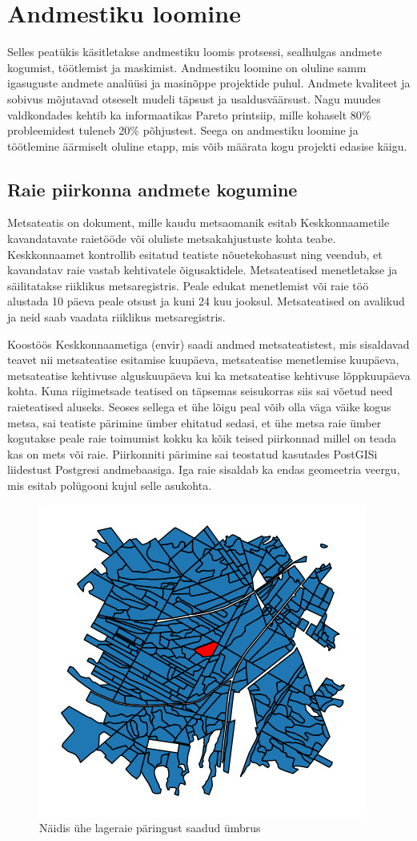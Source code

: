 \section{Andmestiku loomine}
Selles peatükis käsitletakse andmestiku loomis protsessi, sealhulgas andmete kogumist, töötlemist ja maskimist. Andmestiku loomine on oluline samm igasuguste andmete analüüsi ja masinõppe projektide puhul. Andmete kvaliteet ja sobivus mõjutavad otseselt mudeli täpsust ja usaldusväärsust. Nagu muudes valdkondades kehtib ka informaatikas Pareto printsiip, mille kohaselt 80\% probleemidest tuleneb 20\% põhjustest. Seega on andmestiku loomine ja töötlemine äärmiselt oluline etapp, mis võib määrata kogu projekti edasise käigu.

\subsection{Raie piirkonna andmete kogumine}
Metsateatis on dokument, mille kaudu metsaomanik esitab Keskkonnaametile
kavandatavate raietööde või oluliste metsakahjustuste kohta teabe. Keskkonnaamet
kontrollib esitatud teatiste nõuetekohasust ning veendub, et kavandatav raie
vastab kehtivatele õigusaktidele. Metsateatised menetletakse ja säilitatakse
riiklikus metsaregistris. Peale edukat menetlemist või raie töö alustada 10 päeva peale otsust ja kuni 24 kuu jooksul. \cite{MetsateatisJaMetsaregister} Metsateatised on avalikud ja neid saab vaadata riiklikus metsaregistris.

Koostöös Keskkonnaametiga (envir) saadi andmed metsateatistest, mis sisaldavad teavet nii metsateatise esitamise kuupäeva, metsateatise menetlemise kuupäeva, metsateatise kehtivuse alguskuupäeva kui ka metsateatise kehtivuse lõppkuupäeva kohta. Kuna riigimetsade teatised on täpsemas seisukorras siis sai võetud need raieteatised aluseks. Seoses sellega et ühe lõigu peal võib olla väga väike kogus metsa, sai teatiste pärimine ümber ehitatud sedasi, et ühe metsa raie ümber kogutakse peale raie toimumist kokku ka kõik teised piirkonnad millel on teada kas on mets või raie. Piirkonniti pärimine sai teostatud kasutades PostGISi liidestust Postgresi andmebaasiga. Iga raie sisaldab ka endas geomeetria veergu, mis esitab polügooni kujul selle asukohta.


\begin{figure}[hb]
    \centering
    \includegraphics[width=.5\textwidth]{figures/andmestik/er_id_is10124223.png}
    \caption{Näidis ühe lageraie päringust saadud ümbrus}
    \label{fig:umbrusexample}
\end{figure}

